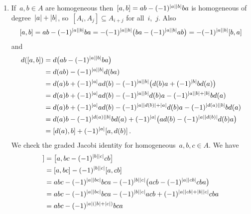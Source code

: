 \begin{enumerate}
  \item
    If~$a, b \in A$ are homogeneous then~$[a,b] = ab - (-1)^{\lvert a\rvert \lvert b\rvert} ba$ is homogeneous of degree~$\lvert a\rvert + \lvert b\rvert$, so~$[A_i, A_j] \subseteq A_{i+j}$ for all~$i$,~$j$.
    Also
    \[
      [a,b]
      =
      ab - (-1)^{\lvert a\rvert \lvert b\rvert} ba
      =
      -(-1)^{\lvert a\rvert \lvert b\rvert} \bigl( ba - (-1)^{\lvert a\rvert \lvert b\rvert} ab \bigr)
      =
      -(-1)^{\lvert a\rvert \lvert b\rvert} [b,a]
    \]
    and
    \begingroup
    \allowdisplaybreaks
    \begin{align*}
      d([a,b])
      &=
      d\bigl( ab - (-1)^{\lvert a\rvert \lvert b\rvert} ba \bigr)
      \\
      &=
      d(ab) - (-1)^{\lvert a\rvert \lvert b\rvert} d(ba)
      \\
      &=
        d(a) b
      + (-1)^{\lvert a\rvert} a d(b)
      - (-1)^{\lvert a\rvert \lvert b\rvert} \bigl( d(b) a + (-1)^{\lvert b\rvert} b d(a) \bigr)
      \\
      &=
        d(a) b
      + (-1)^{\lvert a\rvert} a d(b)
      - (-1)^{\lvert a\rvert \lvert b\rvert} d(b) a
      - (-1)^{\lvert a\rvert \lvert b\rvert + \lvert b\rvert} b d(a)
      \\
      &=
        d(a) b
      + (-1)^{\lvert a\rvert} a d(b)
      - (-1)^{\lvert a\rvert \lvert d(b)\rvert + \lvert a\rvert} d(b) a
      - (-1)^{\lvert d(a)\rvert \lvert b\rvert} b d(a)
      \\
      &=
        d(a) b - (-1)^{\lvert d(a)\rvert \lvert b\rvert} b d(a)
      + (-1)^{\lvert a\rvert} \bigl( a d(b) - (-1)^{\lvert a\rvert \lvert d(b)\rvert} d(b) a \bigr)
      \\
      &=
      [d(a), b] + (-1)^{\lvert a\rvert} [a, d(b)] \,.
    \end{align*}
    \endgroup
    We check the graded Jacobi identity for homogeneous~$a, b, c \in A$.
    We have
    \begingroup
    \allowdisplaybreaks
    \begin{align*}
      [a,[b,c]]
      &=
      \bigl[ a, bc - (-1)^{\hdeg{b} \hdeg{c}} cb \bigr]
      \\
      &=
      [a, bc] - (-1)^{\hdeg{b} \hdeg{c}} [a, cb]
      \\
      &=
        abc - (-1)^{\hdeg{a} \hdeg{bc}} bca
      - (-1)^{\hdeg{b} \hdeg{c}} \bigl( acb - (-1)^{\hdeg{a} \hdeg{cb}} cba \bigr)
      \\
      &=
        abc
      - (-1)^{\hdeg{a} \hdeg{bc}} bca
      - (-1)^{\hdeg{b} \hdeg{c}} acb
      + (-1)^{\hdeg{a} \hdeg{cb} + \hdeg{b} \hdeg{c}} cba
      \\
      &=
        abc
      - (-1)^{\hdeg{a} (\hdeg{b} + \hdeg{c})} bca

\end{align*}
\end{enumerate}
